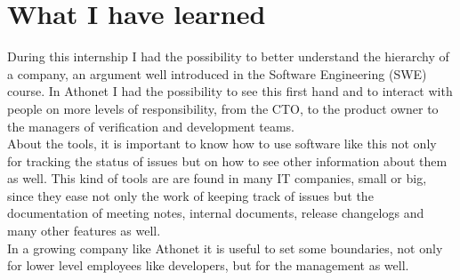 \section{What I have learned}
	During this internship I had the possibility to better understand the hierarchy of a company, an argument well introduced in the Software Engineering (SWE) course.
	In Athonet I had the possibility to see this first hand and to interact with people on more levels of responsibility, from the CTO, to the product owner to the managers of verification and development teams.\\
	About the tools, it is important to know how to use software like this not only for tracking the status of issues but on how to see other information about them as well.
	This kind of tools are are found in many IT companies, small or big, since they ease not only the work of keeping track of issues but the documentation of meeting notes, internal documents, release changelogs and many other features as well.\\
	In a growing company like Athonet it is useful to set some boundaries, not only for lower level employees like developers, but for the management as well.